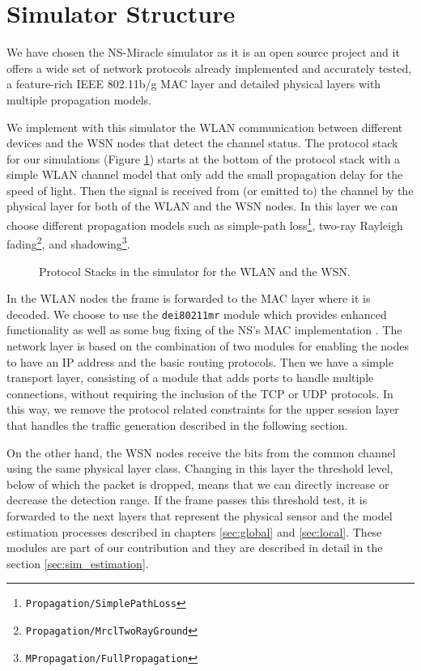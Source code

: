 \section{Simulator Structure} \label{sec:sim_struct}

We have chosen the \acs{NS-Miracle} simulator \cite{NSMiracle} as it is an open source project and it offers a wide set of network protocols already implemented and accurately tested, a feature-rich \acs{IEEE} 802.11b/g \ac{MAC} layer and detailed physical layers with multiple propagation models. 

We implement with this simulator the \ac{WLAN} communication between different devices and the \ac{WSN} nodes that detect the channel status. The protocol stack for our simulations (Figure \ref{fig:sim_stack}) starts at the bottom of the protocol stack with a simple \ac{WLAN} channel model that only add the small propagation delay for the speed of light. Then the signal is received from (or emitted to) the channel by the physical layer for both of the \ac{WLAN} and the \ac{WSN} nodes. In this layer we can choose different propagation models such as simple-path loss\footnote{\texttt{Propagation/SimplePathLoss}}, two-ray Rayleigh fading\footnote{\texttt{Propagation/MrclTwoRayGround}}, and shadowing\footnote{\texttt{MPropagation/FullPropagation}}.

\begin{figure}[htb]
	\begin{center}
		\scalebox{0.75}{}
	\end{center}
	\caption{Protocol Stacks in the simulator for the \ac{WLAN} and the \ac{WSN}.}
	\label{fig:sim_stack}
\end{figure}

In the \ac{WLAN} nodes the frame is forwarded to the \ac{MAC} layer where it is decoded. We choose to use the \texttt{dei80211mr} module which provides enhanced functionality as well as some bug fixing of the \acs{NS}'s \ac{MAC} implementation \cite{dei80211mr}. The network layer is based on the combination of two modules for enabling the nodes to have an \acs{IP} address and the basic routing protocols. Then we have a simple transport layer, consisting of a module that adds ports to handle multiple connections, without requiring the inclusion of the \acs{TCP} or \acs{UDP} protocols. In this way, we remove the protocol related constraints for the upper session layer that handles the traffic generation described in the following section.

On the other hand, the \ac{WSN} nodes receive the bits from the common channel using the same physical layer class. Changing in this layer the threshold level, below of which the packet is dropped, means that we can directly increase or decrease the detection range. If the frame passes this threshold test, it is forwarded to the next layers that represent the physical sensor and the model estimation processes described in chapters \ref{sec:global} and \ref{sec:local}. These modules are part of our contribution and they are described in detail in the section \ref{sec:sim_estimation}.

